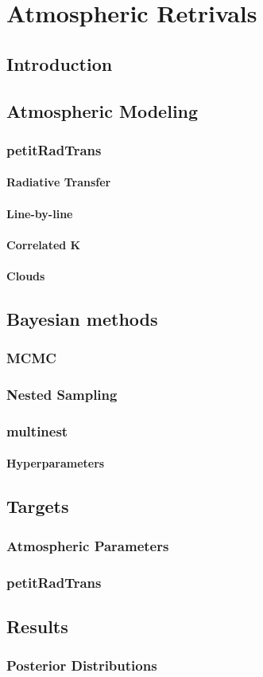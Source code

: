 \chapter{Atmospheric Retrivals}
\section{Introduction}
\section{Atmospheric Modeling}
\subsection{petitRadTrans}
\subsubsection{Radiative Transfer}
\subsubsection{Line-by-line}
\subsubsection{Correlated K}
\subsubsection{Clouds}
\section{Bayesian methods}
\subsection{MCMC}
\subsection{Nested Sampling}
\subsection{multinest}
\subsubsection{Hyperparameters}
\section{Targets}
\subsection{Atmospheric Parameters}
\subsection{petitRadTrans}
\section{Results}
\subsection{Posterior Distributions}